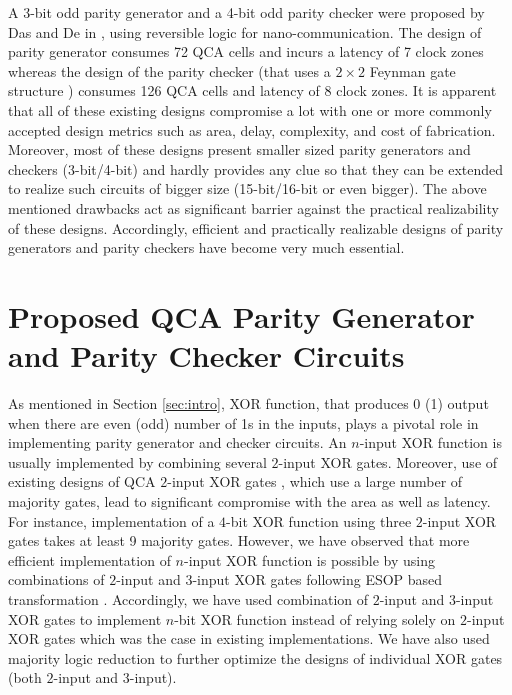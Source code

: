 \documentclass[conference]{IEEEtran}
\begin{document}
A 3-bit odd parity generator and a 4-bit odd parity checker were proposed by Das and De in \cite{Das_FITEE_2016}, using reversible logic for nano-communication. The design of parity generator consumes 72 QCA cells and incurs a latency of 7 clock zones whereas the design of the parity checker (that uses a $2 \times 2$ Feynman gate structure \cite{Feynman_ON1985}) consumes 126 QCA cells and latency of 8 clock zones.
It is apparent that all of these existing designs compromise a lot with one or more commonly accepted design metrics such as area, delay, complexity, and cost of fabrication.
Moreover, most of these designs present smaller sized parity generators and checkers (3-bit/4-bit) and hardly provides any clue so that they can be extended to realize such circuits of bigger size (15-bit/16-bit or even bigger).
The above mentioned drawbacks act as significant barrier against the practical realizability of these designs.
Accordingly, efficient and practically realizable designs of parity generators and parity checkers have become very much essential. 
 
\section{Proposed QCA Parity Generator and Parity Checker Circuits}
\label{sec:Proposed Work}
As mentioned in Section \ref{sec:intro}, XOR function, that produces 0 (1) output when there are even (odd) number of 1s in the inputs, plays a pivotal role in implementing parity generator and checker circuits.
An $n$-input XOR function is usually implemented by combining several $2$-input XOR gates.
Moreover, use of existing designs of QCA $2$-input XOR gates \cite{beigh_2013,shah_IOSR-JCE2014,beigh_ijpap2013}, which use a large number of majority gates, lead to significant compromise with the area as well as latency.
For instance, implementation of a $4$-bit XOR function using three $2$-input XOR gates \cite{beigh_ijpap2013} takes at least 9 majority gates.
However, we have observed that more efficient implementation of $n$-input XOR function is possible by using combinations of $2$-input and $3$-input XOR gates following ESOP based transformation \cite{Feinstein_RMW2007}.
Accordingly, we have used combination of $2$-input and $3$-input XOR gates to implement $n$-bit XOR function instead of relying solely on $2$-input XOR gates which was the case in existing implementations.   
We have also used majority logic reduction \cite{zhang_tnano2004,Hanan_2011, kun_2010} to further optimize the designs of individual XOR gates (both $2$-input and $3$-input).
\end{document}

